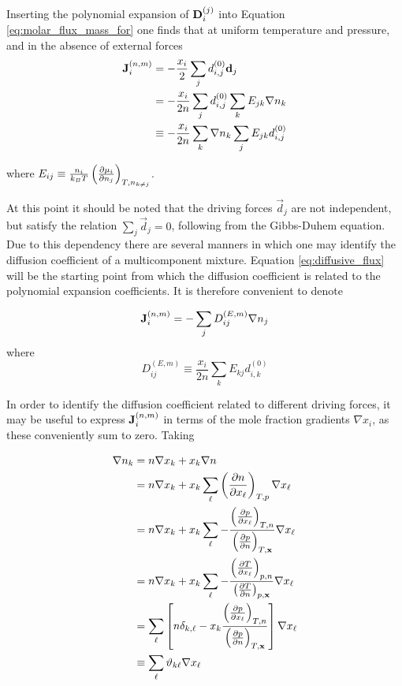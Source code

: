 Inserting the polynomial expansion of $\boldsymbol{\mathrm{D}}_i^{(j)}$ into Equation \eqref{eq:molar_flux_mass_for} one finds that at uniform temperature and pressure, and in the absence of external forces
\begin{equation}
    \begin{split}
        \boldsymbol{\mathrm{J}}^{(n,m)}_i &= - \frac{x_i}{2} \sum_j d_{i,j}^{(0)} \boldsymbol{\mathrm{d}}_j\\
        &= - \frac{x_i}{2n} \sum_j d_{i,j}^{(0)} \sum_k E_{jk} \nabla n_k \\
        &\equiv - \frac{x_i}{2n}\sum_k \nabla n_k \sum_j E_{jk} d_{i,j}^{(0)}
    \end{split}
    \label{eq:diffusive_flux}
\end{equation}

where $E_{ij} \equiv \frac{n_i}{k_B T} \left(\frac{\partial \mu_i}{\partial n_j}\right)_{T,n_{k \neq j}}$.

At this point it should be noted that the driving forces $\Vec{d}_j$ are not independent, but satisfy the relation $\sum_j \Vec{d}_j = 0$, following from the Gibbs-Duhem equation. Due to this dependency there are several manners in which one may identify the diffusion coefficient of a multicomponent mixture. Equation \eqref{eq:diffusive_flux} will be the starting point from which the diffusion coefficient is related to the polynomial expansion coefficients. It is therefore convenient to denote

\begin{equation}
    \boldsymbol{\mathrm{J}}^{(n,m)}_i = - \sum_j D^{(E,m)}_{ij} \nabla n_j
    \label{eq:diffusive_flux2}
\end{equation}
where 
\begin{equation}
    D^{(E,m)}_{ij} \equiv \frac{x_i}{2n} \sum_k E_{kj} d_{i,k}^{(0)}
\end{equation}

In order to identify the diffusion coefficient related to different driving forces, it may be useful to express $\boldsymbol{\mathrm{J}}^{(n,m)}_i$ in terms of the mole fraction gradients $\nabla x_i$, as these conveniently sum to zero. Taking

\begin{equation}
    \begin{split}
        \nabla n_k &= n \nabla x_k + x_k \nabla n\\
        &= n\nabla x_k + x_k \sum_\ell \left(\frac{\partial n}{\partial x_\ell}\right)_{T,p} \nabla x_\ell \\
        &= n \nabla x_k + x_k \sum_\ell - \frac{\left(\frac{\partial p}{\partial x_\ell}\right)_{T,n}}{\left(\frac{\partial p}{\partial n}\right)_{T,\boldsymbol{\mathrm{x}}}} \nabla x_\ell \\
        &= n \nabla x_k + x_k \sum_\ell - \frac{\left(\frac{\partial T}{\partial x_\ell}\right)_{p,n}}{\left(\frac{\partial T}{\partial n}\right)_{p,\boldsymbol{\mathrm{x}}}} \nabla x_\ell \\
        &= \sum_{\ell} \left[ n \delta_{k,\ell} - x_k \frac{\left(\frac{\partial p}{\partial x_\ell}\right)_{T,n}}{\left(\frac{\partial p}{\partial n}\right)_{T,\boldsymbol{\mathrm{x}}}} \right] \nabla x_\ell \\
        &\equiv \sum_{\ell} \vartheta_{k\ell} \nabla x_\ell
    \end{split}
    \label{eq:nabla_k_nabla_x}
\end{equation}

